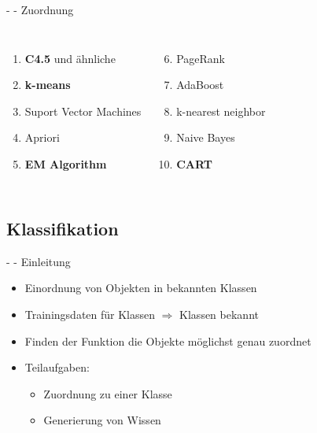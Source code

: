 \documentclass[fleqn,11pt,aspectratio=43]{beamer}
\begin{document}
\begin{frame}{\insertsectionhead - \insertsubsectionhead - Zuordnung}
\begin{columns}[onlytextwidth]
		\begin{enumerate}[label=\bfseries\arabic*.]
		\item \textbf{C4.5} und ähnliche %
		\item \textbf{k-means} %
		\item Suport Vector Machines %
		\item Apriori %
		\item \textbf{EM Algorithm} %
		\end{enumerate}
	    \begin{enumerate}[label=\bfseries\arabic*.]
	    \setcounter{enumi}{5}
	    \item PageRank
	    \item AdaBoost %
	    \item k-nearest neighbor %
	    \item Naive Bayes %
	    \item \textbf{CART} %
	    \end{enumerate}
\end{columns}
\end{frame}

\subsection{Klassifikation~}

\begin{frame}{\insertsectionhead - \insertsubsectionhead - Einleitung \cite{ester2000knowledge}}
\begin{itemize}
\item Einordnung von Objekten in bekannten Klassen
\item Trainingsdaten für Klassen $\Rightarrow$ Klassen bekannt
\item Finden der Funktion die Objekte möglichst genau zuordnet
\item Teilaufgaben:
\begin{itemize}
\item Zuordnung zu einer Klasse
\item Generierung von Wissen 
\end{itemize}
\end{itemize}
\end{frame}
\end{document}
